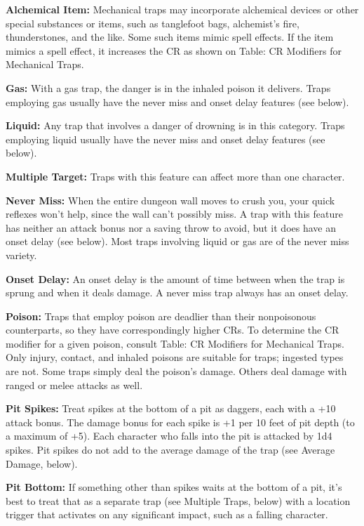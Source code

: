 \documentclass{article}
\begin{document}
\textbf{Alchemical Item:} Mechanical traps may incorporate alchemical devices or 
other special substances or items, such as tanglefoot bags, alchemist's fire, thunderstones, 
and the like. Some such items mimic spell effects. If the item mimics a spell effect, 
it increases the CR as shown on Table: CR Modifiers for Mechanical Traps.

\textbf{Gas:} With a gas trap, the danger is in the inhaled poison it delivers. 
Traps employing gas usually have the never miss and onset delay features (see below).

\textbf{Liquid:} Any trap that involves a danger of drowning is in this category. 
Traps employing liquid usually have the never miss and onset delay features (see 
below). 

\textbf{Multiple Target:} Traps with this feature can affect more than one character.

\textbf{Never Miss:} When the entire dungeon wall moves to crush you, your quick 
reflexes won't help, since the wall can't possibly miss. A trap with this feature 
has neither an attack bonus nor a saving throw to avoid, but it does have an onset 
delay (see below). Most traps involving liquid or gas are of the never miss variety. 

\textbf{Onset Delay:} An onset delay is the amount of time between when the trap 
is sprung and when it deals damage. A never miss trap always has an onset delay.

\textbf{Poison: }Traps that employ poison are deadlier than their nonpoisonous 
counterparts, so they have correspondingly higher CRs. To determine the CR modifier 
for a given poison, consult Table: CR Modifiers for Mechanical Traps. Only injury, 
contact, and inhaled poisons are suitable for traps; ingested types are not. Some 
traps simply deal the poison's damage. Others deal damage with ranged or melee 
attacks as well. 

\textbf{Pit Spikes:} Treat spikes at the bottom of a pit as daggers, each with 
a +10 attack bonus. The damage bonus for each spike is +1 per 10 feet of pit depth 
(to a maximum of +5). Each character who falls into the pit is attacked by 1d4 
spikes. Pit spikes do not add to the average damage of the trap (see Average Damage, 
below).

\textbf{Pit Bottom:} If something other than spikes waits at the bottom of a pit, 
it's best to treat that as a separate trap (see Multiple Traps, below) with a location 
trigger that activates on any significant impact, such as a falling character. 
\end{document}
